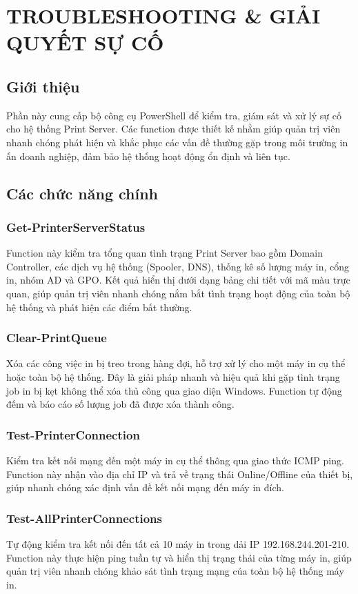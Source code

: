 \chapter{\textbf{TROUBLESHOOTING \& GIẢI QUYẾT SỰ CỐ}}

\section{Giới thiệu}
Phần này cung cấp bộ công cụ PowerShell để kiểm tra, giám sát và xử lý sự cố cho hệ thống Print Server. Các function được thiết kế nhằm giúp quản trị viên nhanh chóng phát hiện và khắc phục các vấn đề thường gặp trong môi trường in ấn doanh nghiệp, đảm bảo hệ thống hoạt động ổn định và liên tục.

\section{Các chức năng chính}

\subsection{Get-PrinterServerStatus}
Function này kiểm tra tổng quan tình trạng Print Server bao gồm Domain Controller, các dịch vụ hệ thống (Spooler, DNS), thống kê số lượng máy in, cổng in, nhóm AD và GPO. Kết quả hiển thị dưới dạng bảng chi tiết với mã màu trực quan, giúp quản trị viên nhanh chóng nắm bắt tình trạng hoạt động của toàn bộ hệ thống và phát hiện các điểm bất thường.

\subsection{Clear-PrintQueue}
Xóa các công việc in bị treo trong hàng đợi, hỗ trợ xử lý cho một máy in cụ thể hoặc toàn bộ hệ thống. Đây là giải pháp nhanh và hiệu quả khi gặp tình trạng job in bị kẹt không thể xóa thủ công qua giao diện Windows. Function tự động đếm và báo cáo số lượng job đã được xóa thành công.

\subsection{Test-PrinterConnection}
Kiểm tra kết nối mạng đến một máy in cụ thể thông qua giao thức ICMP ping. Function này nhận vào địa chỉ IP và trả về trạng thái Online/Offline của thiết bị, giúp nhanh chóng xác định vấn đề kết nối mạng đến máy in đích.

\subsection{Test-AllPrinterConnections}
Tự động kiểm tra kết nối đến tất cả 10 máy in trong dải IP 192.168.244.201-210. Function này thực hiện ping tuần tự và hiển thị trạng thái của từng máy in, giúp quản trị viên nhanh chóng khảo sát tình trạng mạng của toàn bộ hệ thống máy in.

